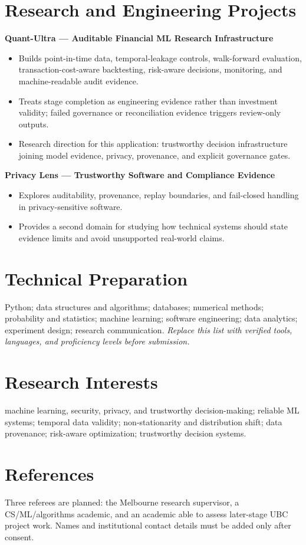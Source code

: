 \documentclass[11pt]{article}
\begin{document}
\section*{Research and Engineering Projects}
\textbf{Quant-Ultra --- Auditable Financial ML Research Infrastructure}
\begin{itemize}
\item Builds point-in-time data, temporal-leakage controls, walk-forward evaluation, transaction-cost-aware backtesting, risk-aware decisions, monitoring, and machine-readable audit evidence.
\item Treats stage completion as engineering evidence rather than investment validity; failed governance or reconciliation evidence triggers review-only outputs.
\item Research direction for this application: trustworthy decision infrastructure joining model evidence, privacy, provenance, and explicit governance gates.
\end{itemize}

\begin{samepage}
\textbf{Privacy Lens --- Trustworthy Software and Compliance Evidence}
\begin{itemize}
\item Explores auditability, provenance, replay boundaries, and fail-closed handling in privacy-sensitive software.
\item Provides a second domain for studying how technical systems should state evidence limits and avoid unsupported real-world claims.
\end{itemize}
\end{samepage}

\section*{Technical Preparation}
Python; data structures and algorithms; databases; numerical methods; probability and statistics; machine learning; software engineering; data analytics; experiment design; research communication. \textit{Replace this list with verified tools, languages, and proficiency levels before submission.}

\section*{Research Interests}
machine learning, security, privacy, and trustworthy decision-making; reliable ML systems; temporal data validity; non-stationarity and distribution shift; data provenance; risk-aware optimization; trustworthy decision systems.

\section*{References}
Three referees are planned: the Melbourne research supervisor, a CS/ML/algorithms academic, and an academic able to assess later-stage UBC project work. Names and institutional contact details must be added only after consent.
\end{document}
